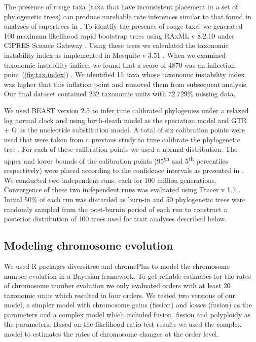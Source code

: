 The presence of rouge taxa (taxa that have inconsistent placement in a set of phylogenetic trees) can produce unreliable rate inferences similar to that found in analyses of supertrees in \cite{rabosky2015b}.
To identify the presence of rouge taxa, we generated 100 maximum likelihood rapid bootstrap trees using RAxML v 8.2.10 under CIPRES Science Gateway \citep{stamatakis2014raxml,miller2010cipres}.
Using these trees we calculated the taxonomic instability index as implemented in Mesquite v 3.51 \citep{maddison2018mesquite}.
When we examined taxonomic instability indices we found that a score of 4870 was an inflection point (\cref{fig:tax.index}) \citep{aberer2012roguetaxa}.
We identified 16 taxa whose taxonomic instability index was higher that this inflation point and removed them from subsequent analysis.
Our final dataset contained 232 taxonomic units with 72.729\% missing data.

We used BEAST version 2.5 \citep{bouckaert2014beast} to infer time calibrated phylogenies under a relaxed log normal clock and using birth-death model as the speciation model and GTR + G as the nucleotide substitution model.
A total of six calibration points were used that were taken from a previous study to time calibrate the phylogenetic tree \citep{misof2014phylogenomics}.
For each of these calibration points we used a normal distribution.
The upper and lower bounds of the calibration points (95\textsuperscript{th} and 5\textsuperscript{th} percentiles respectively) were placed according to the confidence intervals as presented in \citet{misof2014phylogenomics}. 
We conducted two independent runs, each for 100 million generations.
Convergence of these two independent runs was evaluated using Tracer v 1.7 \citep{rambaut2018tracer}.
Initial 50\% of each run was discarded as burn-in and 50 phylogenetic trees were randomly sampled from the post-burnin period of each run to construct a posterior distribution of 100 trees used for trait analyses described below.

\subsection{Modeling chromosome evolution}
We used R packages diversitree \citep{fitzjohn2012} and chromePlus \citep{blackmon2019meiotic} to model the chromosome number evolution in a Bayesian framework.
To get reliable estimates for the rates of chromosome number evolution we only evaluated orders with at least 20 taxonomic units which resulted in four orders.
We tested two versions of our model, a simpler model with chromosome gains (fission) and losses (fusion) as the parameters and a complex model which included fusion, fission and polyploidy as the parameters.
Based on the likelihood ratio test results we used the complex model to estimates the rates of chromosome changes at the order level.


